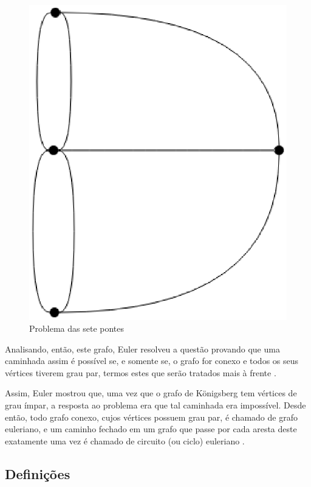 \begin{figure}[!h]
	\centering
	\includegraphics[scale=0.25]{figuras/capitulo2/sete_pontes.eps}
	\caption[Problema das sete pontes]{Problema das sete pontes \cite{Ore:1963}}
	\label{sete_pontes}
\end{figure}

Analisando, então, este grafo, Euler resolveu a questão provando que uma caminhada assim é possível se, e somente se, o grafo for conexo e todos os seus vértices tiverem grau par, termos estes que serão tratados mais à frente \cite{Malta:2008}.

Assim, Euler mostrou que, uma vez que o grafo de Königsberg tem vértices de grau ímpar, a resposta ao problema era que tal caminhada era impossível. Desde então, todo grafo conexo, cujos vértices possuem grau par, é chamado de grafo euleriano, e um caminho fechado em um grafo que passe por cada aresta deste exatamente uma vez é chamado de circuito (ou ciclo) euleriano \cite{Malta:2008}.

\subsection{Definições}

